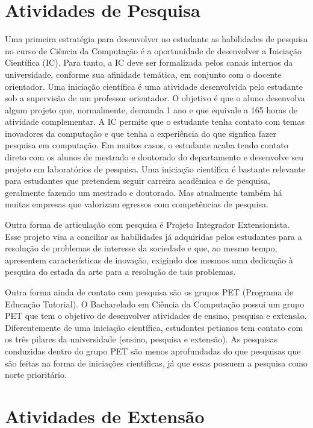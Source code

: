 \section{Atividades de Pesquisa}

Uma primeira estratégia para desenvolver no estudante as habilidades de pesquisa no curso de Ciência da Computação é a oportunidade de desenvolver a Iniciação Científica (IC). Para tanto, a IC deve ser formalizada pelos canais internos da universidade, conforme sua afinidade temática, em conjunto com o docente orientador. Uma iniciação científica é uma atividade desenvolvida pelo estudante sob a supervisão de um professor orientador. O objetivo é que o aluno desenvolva algum projeto que, normalmente, demanda 1 ano e que equivale a 165 horas de atividade complementar. A IC permite que o estudante tenha contato com temas inovadores da computação e que tenha a experiência do que signfica fazer pesquisa em computação. Em muitos casos, o estudante acaba tendo contato direto com os alunos de mestrado e doutorado do departamento e desenvolve seu projeto em laboratórios de pesquisa. Uma iniciação científica é bastante relevante para estudantes que pretendem seguir carreira acadêmica e de pesquisa, geralmente fazendo um mestrado e doutorado. Mas atualmente também há muitas empresas que valorizam egressos com competências de pesquisa. 

Outra forma de articulação com pesquisa é Projeto Integrador Extensionista. Esse projeto visa a conciliar as habilidades já adquiridas pelos estudantes para a resolução de problemas de interesse da sociedade e que, ao mesmo tempo, apresentem características de inovação, exigindo dos mesmos uma dedicação à pesquisa do estada da arte para a resolução de tais problemas.

Outra forma ainda de contato com pesquisa são os grupos PET (Programa de Educação Tutorial). O Bacharelado em Ciência da Computação possui um grupo PET que tem o objetivo de desenvolver atividades de ensino, pesquisa e extensão. Diferentemente de uma iniciação científica, estudantes petianos tem contato com os três pilares da universidade (ensino, pesquisa e extensão). As pesquisas conduzidas dentro do grupo PET são menos aprofundadas do que pesquisas que são feitas na forma de iniciações científicas, já que essas possuem a pesquisa como norte prioritário. 

\section{Atividades de Extensão}

